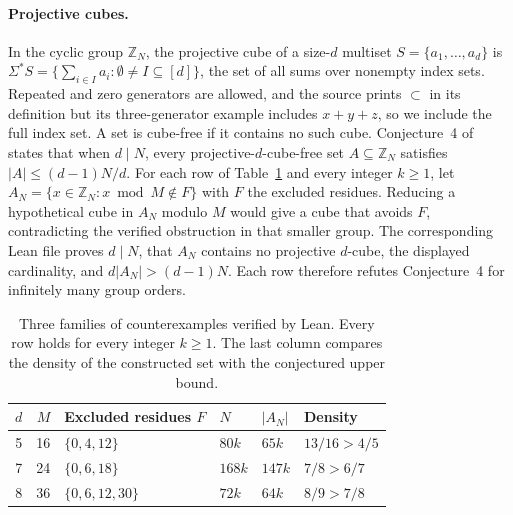 \paragraph{Projective cubes.}
In the cyclic group $\mathbb Z_N$, the projective cube of a size-$d$ multiset $S=\{a_1,\ldots,a_d\}$ is $\Sigma^*S=\{\sum_{i\in I}a_i:\emptyset\ne I\subseteq[d]\}$, the set of all sums over nonempty index sets. Repeated and zero generators are allowed, and the source prints $\subset$ in its definition but its three-generator example includes $x+y+z$, so we include the full index set. A set is cube-free if it contains no such cube. Conjecture~4 of \citet{meng2026cubefree} states that when $d\mid N$, every projective-$d$-cube-free set $A\subseteq\mathbb Z_N$ satisfies $|A|\le(d-1)N/d$. For each row of Table~\ref{tab:projective-cube-families} and every integer $k\ge1$, let $A_N=\{x\in\mathbb Z_N:x\bmod M\notin F\}$ with $F$ the excluded residues. Reducing a hypothetical cube in $A_N$ modulo $M$ would give a cube that avoids $F$, contradicting the verified obstruction in that smaller group. The corresponding Lean file proves $d\mid N$, that $A_N$ contains no projective $d$-cube, the displayed cardinality, and $d|A_N|>(d-1)N$. Each row therefore refutes Conjecture~4 for infinitely many group orders.

\begin{table}[ht]
\centering
\caption{Three families of counterexamples verified by Lean. Every row
holds for every integer $k\ge1$. The last column compares the density
of the constructed set with the conjectured upper bound.}
\label{tab:projective-cube-families}
\small
\begin{tabular}{@{}rrllll@{}}
\toprule
$d$ & $M$ & Excluded residues $F$ & $N$ & $|A_N|$ & Density \\
\midrule
5 & 16 & $\{0,4,12\}$ & $80k$ & $65k$ & $13/16>4/5$ \\
7 & 24 & $\{0,6,18\}$ & $168k$ & $147k$ & $7/8>6/7$ \\
8 & 36 & $\{0,6,12,30\}$ & $72k$ & $64k$ & $8/9>7/8$ \\
\bottomrule
\end{tabular}
\end{table}

